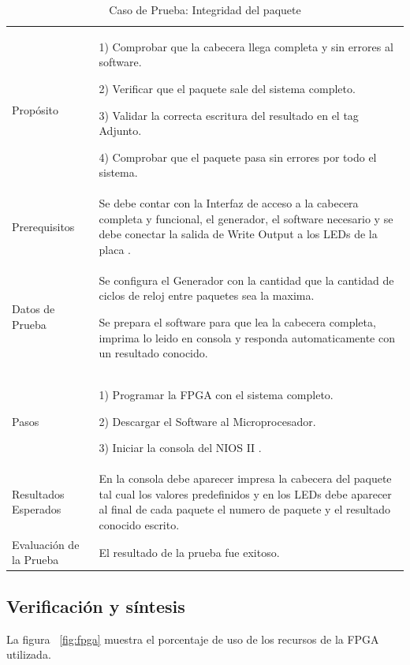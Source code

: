 \begin{table}
	\begin{tabular}{|>{\columncolor[gray]{0.8}}l|p{9cm}|} \hline
\multicolumn{2}{|>{\columncolor[gray]{0.8}}l|}{\textbf{Caso de Prueba: Integridad del paquete }}\\ \hline
Propósito  & 1) Comprobar que la cabecera llega completa y sin errores al software. 

2) Verificar que el paquete sale del sistema completo.

3) Validar la correcta escritura del resultado en el tag Adjunto.

4) Comprobar que el paquete pasa sin errores por todo el sistema. 
\\ \hline
 Prerequisitos  & Se debe contar con la Interfaz de acceso a la cabecera completa y funcional, el generador, el software necesario y se debe conectar la salida de Write Output a los LEDs de la placa .\\ \hline
 Datos de Prueba & Se configura el Generador con la cantidad que la cantidad de ciclos de reloj entre paquetes sea la maxima. 

Se prepara el software para que lea la cabecera completa, imprima lo leido en consola y responda automaticamente con un resultado conocido. 
 \\ \hline
 Pasos & 1) Programar la FPGA con el sistema completo.

2) Descargar el Software al Microprocesador.

3) Iniciar la consola del NIOS II .
\\ \hline
 Resultados Esperados & En la consola debe aparecer impresa la cabecera del paquete tal cual los valores predefinidos y en los LEDs debe aparecer al final de cada paquete el numero de paquete y el resultado conocido escrito.  \\ \hline
 Evaluación de la Prueba  & El resultado de la prueba fue exitoso.\\ \hline
	\end{tabular}
	\caption{Caso de Prueba: Integridad del paquete}
	\label{tab:testsoc}
\end{table}



\newpage
\subsection{Verificación y síntesis}

La figura ~\ref{fig:fpga} muestra el porcentaje de uso de los recursos de la FPGA utilizada.

